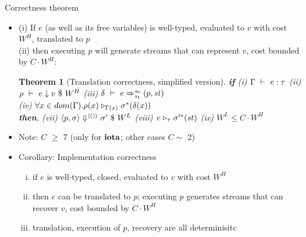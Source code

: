 \documentclass{beamer}
\newtheorem{thm}{Theorem}
\newtheorem{cor}[thm]{Corollary}
\begin{document}
\begin{frame}{Correctness theorem}
\begin{itemize}
	\item (i) If $e$ (as well as its free variables) is well-typed, evaluated to $v$ with cost $W^H$, translated to $p$ \\
	(ii) then executing $p$ will generate streams that can represent $v$, cost bounded by  $C \cdot W^H$: 
	
\begin{thm}[Translation correctness, simplified version]
	\small 
	\textbf{if}
    (i) $\Gamma \ \vdash\  e : \tau$ \quad (ii) $\rho \ \vdash\  e \downarrow v \ \$ \ W^H$ \quad
	(iii) $\delta \ \vdash\  e \Rightarrow^{\mathit{s}_0}_{\mathit{s}_1} (p,\mathit{st})$ \\ 
	(iv) $\forall x \in dom(\Gamma). \rho(x) \mathrel{\triangleright_{\Gamma(x)}} \sigma^*(\delta(x))$ \\
	\textbf{then},
	(vii) $\left\langle p,\sigma \right\rangle \Downarrow^{\langle () \rangle} \sigma' \ \$ \ W^L$ \quad
    (viii)  $v \mathrel{\triangleright_{\tau}} \sigma'^*(\mathit{st})$ \quad
	(ix) $W^L \le C \cdot W^H$  \\
	\end{thm}
	\item Note: $C$ $\ge$ 7 (only for $\mathbf{iota}$; other cases $C \sim$ 2) 

	

\pause
\item Corollary: Implementation correctness
  \begin{enumerate}[(i)]
	\item if $e$ is well-typed, closed, evaluated to $v$ with cost $W^H$
	\item then $e$ can be translated to $p$; executing $p$ generates streams that can recover $v$, cost bounded by $C \cdot W^H$ 
	\item translation, execution of $p$, recovery are all determinisitc
\end{enumerate}

\end{itemize}
\end{frame}
\end{document}

